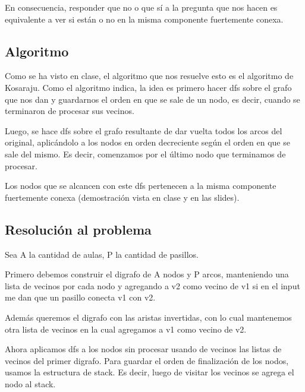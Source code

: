 En consecuencia, responder que no o que sí a la pregunta que nos hacen es equivalente a ver si están o no en la misma componente fuertemente conexa.\newline

\subsection{Algoritmo}

Como se ha visto en clase, el algoritmo que nos resuelve esto es el algoritmo de Kosaraju. Como el algoritmo indica, la idea es primero hacer dfs sobre el grafo que nos dan y guardarnos el orden en que se sale de un nodo, es decir, cuando se terminaron de procesar sus vecinos. \newline

Luego, se hace dfs sobre el grafo resultante de dar vuelta todos los arcos del original, aplicándolo a los nodos en orden decreciente según el orden en que se sale del mismo. Es decir, comenzamos por el último nodo que terminamos de procesar. \newline

Los nodos que se alcancen con este dfs pertenecen a la misma componente fuertemente conexa (demostración vista en clase y en las slides).\newline


\subsection{Resolución al problema}

Sea A la cantidad de aulas, P la cantidad de pasillos.\newline

Primero debemos construir el digrafo de A nodos y P arcos, manteniendo una lista de vecinos por cada nodo y agregando a v2 como vecino de v1 si en el input me dan que un pasillo conecta v1 con v2.\newline

Además queremos el digrafo con las aristas invertidas, con lo cual mantenemos otra lista de vecinos en la cual agregamos a v1 como vecino de v2.\newline

Ahora aplicamos dfs a los nodos sin procesar usando de vecinos las listas de vecinos del primer digrafo. Para guardar el orden de finalización de los nodos, usamos la estructura de stack. Es decir, luego de visitar los vecinos se agrega el nodo al stack.\newline

